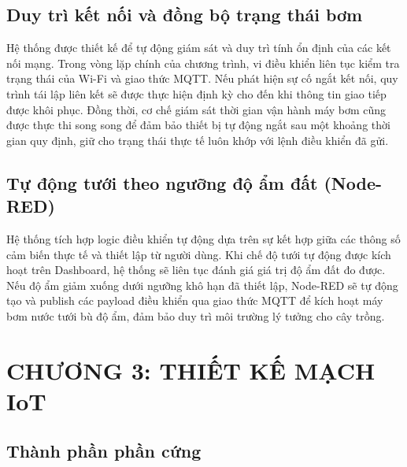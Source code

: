 \documentclass[12pt, a4paper]{article}
\begin{document}
\subsection{Duy trì kết nối và đồng bộ trạng thái bơm}

Hệ thống được thiết kế để tự động giám sát và duy trì tính ổn định của các kết nối mạng. Trong vòng lặp chính của chương trình, vi điều khiển liên tục kiểm tra trạng thái của Wi-Fi và giao thức MQTT. Nếu phát hiện sự cố ngắt kết nối, quy trình tái lập liên kết sẽ được thực hiện định kỳ cho đến khi thông tin giao tiếp được khôi phục. Đồng thời, cơ chế giám sát thời gian vận hành máy bơm cũng được thực thi song song để đảm bảo thiết bị tự động ngắt sau một khoảng thời gian quy định, giữ cho trạng thái thực tế luôn khớp với lệnh điều khiển đã gửi.

\subsection{Tự động tưới theo ngưỡng độ ẩm đất (Node-RED)}

Hệ thống tích hợp logic điều khiển tự động dựa trên sự kết hợp giữa các thông số cảm biến thực tế và thiết lập từ người dùng. Khi chế độ tưới tự động được kích hoạt trên Dashboard, hệ thống sẽ liên tục đánh giá giá trị độ ẩm đất đo được. Nếu độ ẩm giảm xuống dưới ngưỡng khô hạn đã thiết lập, Node-RED sẽ tự động tạo và publish các payload điều khiển qua giao thức MQTT để kích hoạt máy bơm nước tưới bù độ ẩm, đảm bảo duy trì môi trường lý tưởng cho cây trồng.

\section*{CHƯƠNG 3: THIẾT KẾ MẠCH IoT}
{}
\label{sec:ch3}
\setcounter{section}{3}
\setcounter{subsection}{0}

\subsection{Thành phần phần cứng}
\end{document}
